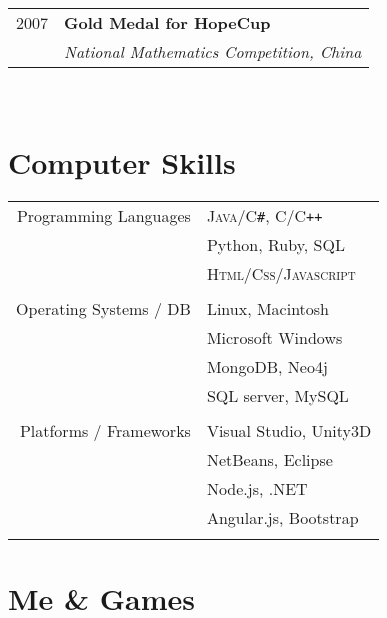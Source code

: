 \documentclass[10pt]{article}
\begin{document}
{\begin{minipage}[t]{0.44\textwidth}
\begin{tabular}{rl}

2007	 & \textbf{Gold Medal for HopeCup}\\
& \textit{National Mathematics Competition, China}
\end{tabular}\\[10pt]


\section{Computer Skills} 

\begin{tabular}{rl}
Programming Languages
& \textsc{Java/C\texttt{\#}, C/C\texttt{++}}\\
& Python, Ruby, SQL\\
& \textsc{Html/Css/Javascript}\\ 
& \\
Operating Systems / DB
& Linux, Macintosh\\
& Microsoft Windows \\
& MongoDB, Neo4j \\
& SQL server, MySQL \\
& \\
Platforms / Frameworks
& Visual Studio, Unity3D\\
& NetBeans, Eclipse \\
& Node.js, .NET\\
& Angular.js, Bootstrap \\
& \\
\end{tabular}


\section{Me \& Games} 


\end{minipage}}
\end{document}
